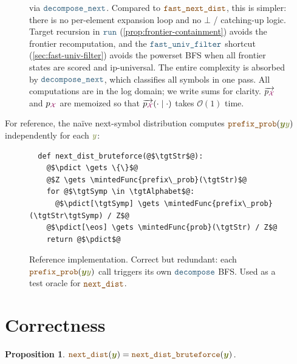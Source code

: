 \documentclass{article}
\theoremstyle{plain}
\newtheorem{proposition}[theorem]{Proposition}
\newcommand{\mymacro}[1]{#1}
\newcommand{\eos}{{\mymacro{\textsc{eos}}}}
\newcommand{\tgtSym}{{\color{CharacterColor}y}}
\newcommand{\tgtSymp}{{\color{CharacterColor}y^\prime}}
\newcommand{\tgtStr}{{\color{CharacterColor}\boldsymbol{y}}}
\newcommand{\pSource}{\mymacro{p_{\srcAlphabet}}}
\newcommand{\prefixLanguageOp}[1]{\overrightarrow{#1}}
\newcommand{\prefixSource}{{\mymacro{\prefixLanguageOp{\pSource}}}}
\newcommand{\srcAlphabet}[0]{{\color{TokenColor}\ensuremath{\mathcal{X}}}\xspace}
\newcommand{\tgtAlphabet}[0]{{\color{CharacterColor}\ensuremath{\mathcal{Y}}}\xspace}
\newcommand{\mintedFunc}[1]{\mbox{\texttt{{\color{orange!50!black}#1}}}}
\newcommand{\myMintedFunc}[1]{\mbox{\texttt{{\color{StormBlue}#1}}}}
\newcommand{\decompose}[0]{\myMintedFunc{decompose}}
\newcommand{\runFrontier}[0]{\myMintedFunc{run}}
\newcommand{\decomposeNext}[0]{\myMintedFunc{decompose\_next}}
\newcommand{\ipUniversal}[0]{\myMintedFunc{fast\_univ\_filter}}
\newcommand{\pdict}{\mymacro{\overline{p}}}
\begin{document}
\begin{figure}[H]
{via $\decomposeNext$.
Compared to $\mintedFunc{fast\_next\_dist}$, this is simpler: there is no
per-element expansion loop and no $\bot$ / catching-up logic.
Target recursion in $\runFrontier$ (\cref{prop:frontier-containment}) avoids
the frontier recomputation, and the $\ipUniversal$ shortcut
(\cref{sec:fast-univ-filter}) avoids the powerset BFS when all frontier states
are scored and ip-universal.
The entire complexity is absorbed by $\decomposeNext$, which classifies all
symbols in one pass.
All computations are in the log domain; we write sums for clarity.
$\prefixSource$ and $\pSource$ are memoized so that
$\prefixSource(\cdot \mid \cdot)$ takes $\mathcal{O}(1)$ time.}
\label{fig:scoring}
\end{figure}

For reference, the na\"ive next-symbol distribution computes
$\mintedFunc{prefix\_prob}(\tgtStr\tgtSym)$ independently for each $\tgtSym$:

\begin{figure}[H]
\centering
\begin{verbatim}
  def next_dist_bruteforce(@$\tgtStr$@):
    @$\pdict \gets \{\}$@
    @$Z \gets \mintedFunc{prefix\_prob}(\tgtStr)$@
    for @$\tgtSymp \in \tgtAlphabet$@:
      @$\pdict[\tgtSymp] \gets \mintedFunc{prefix\_prob}(\tgtStr\tgtSymp) / Z$@
    @$\pdict[\eos] \gets \mintedFunc{prob}(\tgtStr) / Z$@
    return @$\pdict$@
\end{verbatim}
\caption{Reference implementation.
Correct but redundant: each $\mintedFunc{prefix\_prob}(\tgtStr\tgtSym)$ call
triggers its own $\decompose$ BFS.
Used as a test oracle for $\mintedFunc{next\_dist}$.}
\label{fig:bruteforce}
\end{figure}


\section{Correctness}

\begin{proposition}
$\mintedFunc{next\_dist}(\tgtStr) = \mintedFunc{next\_dist\_bruteforce}(\tgtStr)$.
\end{proposition}
\end{document}
